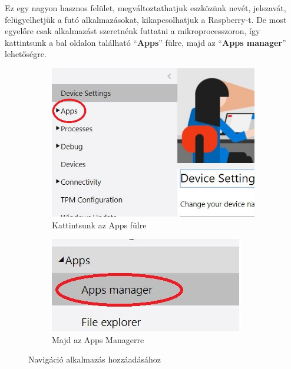 \documentclass[a4paper,12pt]{report}
\begin{document}
    Ez egy nagyon hasznos felület, megváltoztathatjuk eszközünk nevét, jelszavát, felügyelhetjük a futó alkalmazásokat,
    kikapcsolhatjuk a Raspberry-t. De most egyelőre csak alkalmazást szeretnénk futtatni a mikroprocesszoron, így kattintsunk
    a bal oldalon található ``\textbf{Apps}'' fülre, majd az ``\textbf{Apps manager}'' lehetőségre.

    \begin{figure}[h!]
        \centering
        \begin{subfigure}[b]{0.4\linewidth}
            \includegraphics[width=\linewidth]{images/apps.jpg}
            \caption{Kattintsunk az Apps fülre}
        \end{subfigure}
        \begin{subfigure}[b]{0.4\linewidth}
            \includegraphics[width=\linewidth]{images/appsmanager.jpg}
            \caption{Majd az Apps Managerre}
        \end{subfigure}
        \caption{Navigáció alkalmazás hozzáadásához}
        \label{fig:Apps manager}
    \end{figure}
\end{document}
